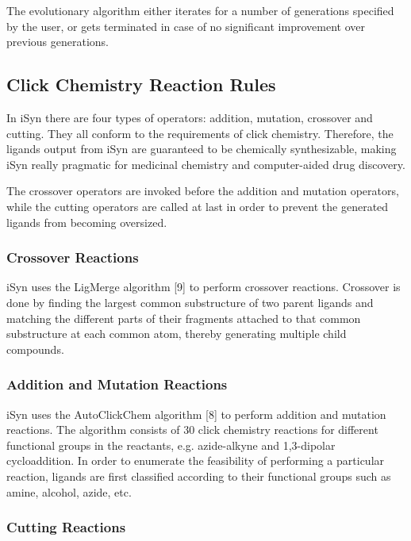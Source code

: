The evolutionary algorithm either iterates for a number of generations specified by the user, or gets terminated in case of no significant improvement over previous generations.

\subsection{Click Chemistry Reaction Rules}

In iSyn there are four types of operators: addition, mutation, crossover and cutting. They all conform to the requirements of click chemistry. Therefore, the ligands output from iSyn are guaranteed to be chemically synthesizable, making iSyn really pragmatic for medicinal chemistry and computer-aided drug discovery.

The crossover operators are invoked before the addition and mutation operators, while the cutting operators are called at last in order to prevent the generated ligands from becoming oversized.

\subsubsection{Crossover Reactions}

iSyn uses the LigMerge algorithm [9] to perform crossover reactions. Crossover is done by finding the largest common substructure of two parent ligands and matching the different parts of their fragments attached to that common substructure at each common atom, thereby generating multiple child compounds.

\subsubsection{Addition and Mutation Reactions}

iSyn uses the AutoClickChem algorithm [8] to perform addition and mutation reactions. The algorithm consists of 30 click chemistry reactions for different functional groups in the reactants, e.g. azide-alkyne and 1,3-dipolar cycloaddition. In order to enumerate the feasibility of performing a particular reaction, ligands are first classified according to their functional groups such as amine, alcohol, azide, etc.

\subsubsection{Cutting Reactions}

